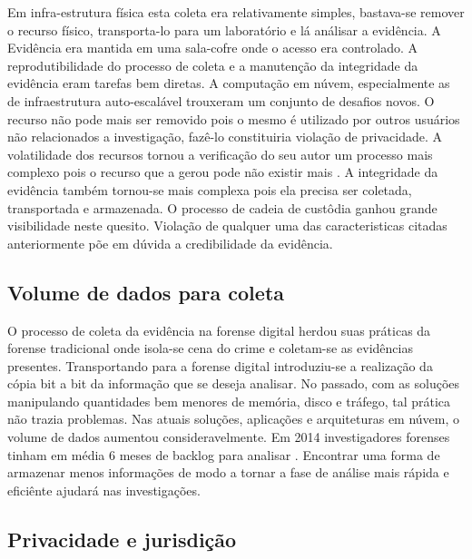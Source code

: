 Em infra-estrutura física esta coleta era relativamente simples, bastava-se remover o recurso físico, transporta-lo para um laboratório e lá análisar a evidência. A Evidência era mantida em uma sala-cofre onde o acesso era controlado.
%
A reprodutibilidade do processo de coleta e a manutenção da integridade da evidência eram tarefas bem diretas.
%
A computação em núvem, especialmente as de infraestrutura auto-escalável trouxeram um conjunto de desafios novos. O recurso não pode mais ser removido pois o mesmo é utilizado por outros usuários não relacionados a investigação, fazê-lo constituiria violação de privacidade.
%
A volatilidade dos recursos tornou a verificação do seu autor um processo mais complexo pois o recurso que a gerou pode não existir mais \cite{SimouCloudChlng:2014}.
%
A integridade da evidência também tornou-se mais complexa pois ela precisa ser coletada, transportada e armazenada. O processo de cadeia de custôdia ganhou grande visibilidade neste quesito.
%
Violação de qualquer uma das caracteristicas citadas anteriormente põe em dúvida a credibilidade da evidência.

\subsection{Volume de dados para coleta}
\label{sec:volumedados}

O processo de coleta da evidência na forense digital herdou suas práticas da forense tradicional onde isola-se cena do crime e coletam-se as evidências presentes. 
%
Transportando para a forense digital introduziu-se a realização da cópia bit a bit da informação que se deseja analisar.
%
No passado, com as soluções manipulando quantidades bem menores de memória, disco e tráfego, tal prática não trazia problemas. Nas atuais soluções, aplicações e arquiteturas em núvem, o volume de dados aumentou consideravelmente.
%
Em 2014 investigadores forenses tinham em média 6 meses de backlog para analisar \cite{QuickIncreaseVolumeImpact:2014}. 
%
Encontrar uma forma de armazenar menos informações de modo a tornar a fase de análise mais rápida e eficiênte ajudará nas investigações.

\subsection{Privacidade e jurisdição}
\label{sec:violacaoprivacidadejuriscdicao}

